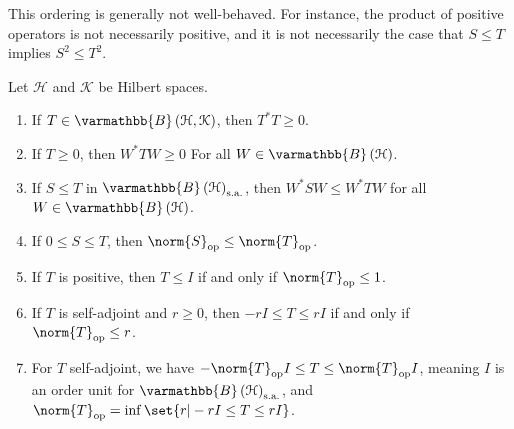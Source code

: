 \documentclass[10pt]{mypackage}
\renewcommand*{\mathbb}[1]{\varmathbb{#1}}
\newcommand{\sa}{\text{s.a.}}
\newcommand{\B}{\mathbb{B}}
\begin{document}
\begin{remark}
  This ordering is generally not well-behaved. For instance, the product of positive operators is not necessarily positive, and it is not necessarily the case that $S\leq T$ implies $S^2 \leq T^2$.
\end{remark}
\begin{proposition}
  Let $\mathcal{H}$ and $\mathcal{K}$ be Hilbert spaces.
  \begin{enumerate}[(1)]
    \item If $T\in \B\left(\mathcal{H},\mathcal{K}\right)$, then $T^{\ast}T \geq 0$.
    \item If $T\geq 0$, then $W^{\ast}TW \geq 0$ For all $W\in \B\left(\mathcal{H}\right)$.
    \item If $S\leq T$ in $\B\left(\mathcal{H}\right)_{\sa}$, then $W^{\ast}SW \leq W^{\ast}TW$ for all $W\in \B\left(\mathcal{H}\right)$.
    \item If $0 \leq S \leq T$, then $\norm{S}_{\text{op}} \leq \norm{T}_{\text{op}}$.
    \item If $T$ is positive, then $T\leq I$ if and only if $\norm{T}_{\text{op}}\leq 1$.
    \item If $T$ is self-adjoint and $r\geq 0$, then $-rI \leq T \leq rI$ if and only if $\norm{T}_{\text{op}} \leq r$.
    \item For $T$ self-adjoint, we have $-\norm{T}_{\text{op}}I \leq T \leq \norm{T}_{\text{op}}I$, meaning $I$ is an order unit for $\B\left(\mathcal{H}\right)_{\sa}$, and $\norm{T}_{\text{op}} = \inf\set{r | -rI \leq T \leq rI}$.
  \end{enumerate}
\end{proposition}
\end{document}

